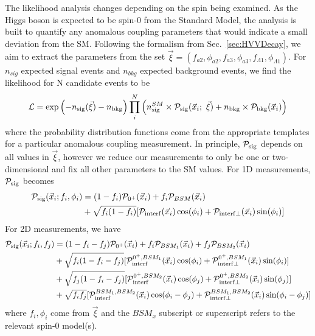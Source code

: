 The likelihood analysis changes depending on the spin being examined. As the Higgs boson is expected to be spin-0 from the Standard Model, the analysis is built to quantify any anomalous coupling parameters that would indicate a small deviation from the SM. Following the formalism from Sec.~\ref{sec:HVVDecay}, we aim to extract the parameters from the set $\vec{\xi} = (f_{a2}, \phi_{a2}, f_{a3}, \phi_{a3},f_{\Lambda 1}, \phi_{\Lambda 1})$. For $n_{sig}$ expected signal events and $n_{bkg}$ expected background events, we find the likelihood for N candidate events to be
\begin{equation}
{{\mathcal{L}}} =  \exp\left( - n_{\rm sig}(\vec{\xi})-n_{\rm bkg}  \right) \prod_i^{N} \left( n^{SM}_{\rm sig} \times{\mathcal{P}}_{\rm sig}(\vec{x}_{i};~\vec{\xi})  +n_{\rm bkg} \times{\mathcal{P}}_{\rm bkg}(\vec{x}_{i}) \right)
\end{equation}
where the probability distribution functions come from the appropriate templates for a particular anomalous coupling measurement. In principle, ${\mathcal{P}}_{\rm sig}$ depends on all values in $\vec{\xi}$, however we reduce our measurements to only be one or two-dimensional and fix all other parameters to the SM values. For 1D measurements, ${\mathcal{P}}_{\rm sig}$ becomes
\begin{equation}
\begin{split}
{\mathcal{P}}_{\rm sig}(\vec{x}_i;f_{i},\phi_{i}) &= (1-f_i) \mathcal{P}_{0^+}(\vec{x}_i) + f_{i} \mathcal{P}_{BSM}(\vec{x}_i) \\ &+\sqrt{f_i (1-f_i)}[\mathcal{P}_{\rm interf}(\vec{x}_i)\cos(\phi_i) + \mathcal{P}_{\rm interf \perp}(\vec{x}_i)\sin(\phi_i)]
\end{split}
\end{equation}
For 2D measurements, we have
\begin{equation}
\begin{split}
{\mathcal{P}}_{\rm sig}(\vec{x}_i;f_{i},f_{j}) &= (1-f_i-f_j) \mathcal{P}_{0^+}(\vec{x}_i) + f_{i} \mathcal{P}_{BSM_1}(\vec{x}_i) + f_{j} \mathcal{P}_{BSM_2}(\vec{x}_i)\\ &+\sqrt{f_i (1-f_i-f_j)}[\mathcal{P}_{\rm interf}^{0^+,BSM_1}(\vec{x}_i)\cos(\phi_i) + \mathcal{P}_{\rm interf \perp}^{0^+,BSM_1}(\vec{x}_i)\sin(\phi_i)] \\
& + \sqrt{f_j (1-f_i-f_j)}[\mathcal{P}_{\rm interf}^{0^+,BSM_2}(\vec{x}_i)\cos(\phi_j) + \mathcal{P}_{\rm interf \perp}^{0^+,BSM_2}(\vec{x}_i)\sin(\phi_j)] \\
& + \sqrt{f_if_j}[\mathcal{P}_{\rm interf}^{BSM_1,BSM_2}(\vec{x}_i)\cos(\phi_i-\phi_j) + \mathcal{P}_{\rm interf \perp}^{BSM_1,BSM_2}(\vec{x}_i)\sin(\phi_i - \phi_j)]
\end{split}
\end{equation}
where $f_i,\phi_i$ come from $\vec{\xi}$ and the $BSM_x$ subscript or superscript refers to the relevant spin-0 model(s).

